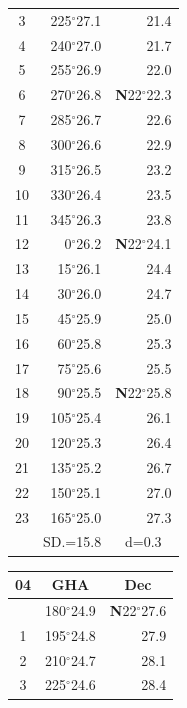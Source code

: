 \documentclass[10pt, a4paper]{report}
\begin{document}
\begin{scriptsize}
\begin{tabular*}{0.2\textwidth}[t]{@{\extracolsep{\fill}}|c|rr|}
3 & 225$^\circ$27.1 & \raisebox{0.24ex}{\boldmath$\cdot$~\boldmath$\cdot$~~}21.4\\
4 & 240$^\circ$27.0 & 21.7\\
5 & 255$^\circ$26.9 & 22.0\\[2Pt]
6 & 270$^\circ$26.8 & \textbf{N}22$^\circ$22.3\\
7 & 285$^\circ$26.7 & 22.6\\
8 & 300$^\circ$26.6 & 22.9\\
9 & 315$^\circ$26.5 & \raisebox{0.24ex}{\boldmath$\cdot$~\boldmath$\cdot$~~}23.2\\
10 & 330$^\circ$26.4 & 23.5\\
11 & 345$^\circ$26.3 & 23.8\\[2Pt]
12 & 0$^\circ$26.2 & \textbf{N}22$^\circ$24.1\\
13 & 15$^\circ$26.1 & 24.4\\
14 & 30$^\circ$26.0 & 24.7\\
15 & 45$^\circ$25.9 & \raisebox{0.24ex}{\boldmath$\cdot$~\boldmath$\cdot$~~}25.0\\
16 & 60$^\circ$25.8 & 25.3\\
17 & 75$^\circ$25.6 & 25.5\\[2Pt]
18 & 90$^\circ$25.5 & \textbf{N}22$^\circ$25.8\\
19 & 105$^\circ$25.4 & 26.1\\
20 & 120$^\circ$25.3 & 26.4\\
21 & 135$^\circ$25.2 & \raisebox{0.24ex}{\boldmath$\cdot$~\boldmath$\cdot$~~}26.7\\
22 & 150$^\circ$25.1 & 27.0\\
23 & 165$^\circ$25.0 & 27.3\\
\hline
\rule{0pt}{2.4ex} & \multicolumn{1}{c}{SD.=15.8} & \multicolumn{1}{c|}{d=0.3}\\
\hline
\end{tabular*}\noindent
\begin{tabular*}{0.2\textwidth}[t]{@{\extracolsep{\fill}}|c|rr|}
\hline
\multicolumn{1}{|c|}{\rule{0pt}{2.6ex}\textbf{04}} & \multicolumn{1}{c}{\textbf{GHA}} & \multicolumn{1}{c|}{\textbf{Dec}}\\
\hline\rule{0pt}{2.6ex}\noindent
0 & 180$^\circ$24.9 & \textbf{N}22$^\circ$27.6\\
1 & 195$^\circ$24.8 & 27.9\\
2 & 210$^\circ$24.7 & 28.1\\
3 & 225$^\circ$24.6 & \raisebox{0.24ex}{\boldmath$\cdot$~\boldmath$\cdot$~~}28.4\\

\end{tabular*}
\end{scriptsize}
\end{document}
